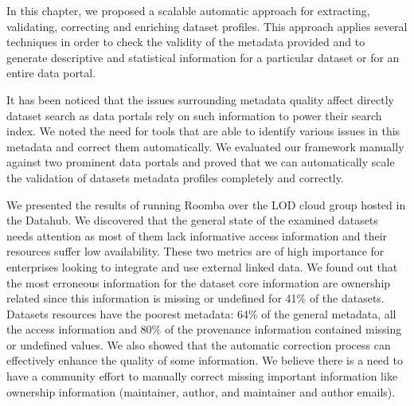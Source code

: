 In this chapter, we proposed a scalable automatic approach for extracting, validating, correcting and enriching dataset profiles. This approach applies several techniques in order to check the validity of the metadata provided and to generate descriptive and statistical information for a particular dataset or for an entire data portal.

It has been noticed that the issues surrounding metadata quality affect directly dataset search as data portals rely on such information to power their search index. We noted the need for tools that are able to identify various issues in this metadata and correct them automatically. We evaluated our framework manually against two prominent data portals and proved that we can automatically scale the validation of datasets metadata profiles completely and correctly.

We presented the results of running Roomba over the LOD cloud group hosted in the Datahub. We discovered that the general state of the examined datasets needs attention as most of them lack informative access information and their resources suffer low availability. These two metrics are of high importance for enterprises looking to integrate and use external linked data. We found out that the most erroneous information for the dataset core information are ownership related since this information is missing or undefined for 41\% of the datasets. Datasets resources have the poorest metadata: 64\% of the general metadata, all the access information and 80\% of the provenance information contained missing or undefined values. We also showed that the automatic correction process can effectively enhance the quality of some information. We believe there is a need to have a community effort to manually correct missing important information like ownership information (maintainer, author, and maintainer and author emails).


